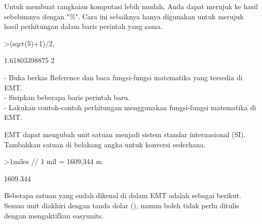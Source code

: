 \documentclass{article}
\begin{document}
\begin{eulernotebook}
\begin{eulercomment}
\begin{eulercomment}
\begin{eulercomment}
\begin{eulercomment}
\begin{eulercomment}
Untuk membuat rangkaian komputasi lebih mudah, Anda dapat merujuk ke hasil
sebelumnya dengan "\%". Cara ini sebaiknya hanya digunakan untuk merujuk hasil
perhitungan dalam baris perintah yang sama.
\end{eulercomment}
\begin{eulerprompt}
>(sqrt(5)+1)/2, %
\end{eulerprompt}
\begin{euleroutput}
  1.61803398875
  2
\end{euleroutput}
\begin{eulercomment}
- Buka berkas Reference dan baca fungsi-fungsi matematika yang tersedia di EMT.\\
- Sisipkan beberapa baris perintah baru.\\
- Lakukan contoh-contoh perhitungan menggunakan fungsi-fungsi matematika di EMT.\\
\end{eulercomment}
\eulersubheading{}
\begin{eulercomment}
\begin{eulercomment}
\begin{eulercomment}
EMT dapat mengubah unit satuan menjadi sistem standar internasional (SI).
Tambahkan satuan di belakang angka untuk konversi sederhana.
\end{eulercomment}
\begin{eulerprompt}
>1miles  // 1 mil = 1609,344 m
\end{eulerprompt}
\begin{euleroutput}
  1609.344
\end{euleroutput}
\begin{eulercomment}
Beberapa satuan yang sudah dikenal di dalam EMT adalah sebagai
berikut. Semua unit diakhiri dengan tanda dolar (\textdollar{}), namun boleh tidak
perlu ditulis dengan mengaktifkan easyunits. 


\end{eulercomment}
\end{eulercomment}
\end{eulercomment}
\end{eulercomment}
\end{eulercomment}
\end{eulercomment}
\end{eulercomment}
\end{eulernotebook}
\end{document}
